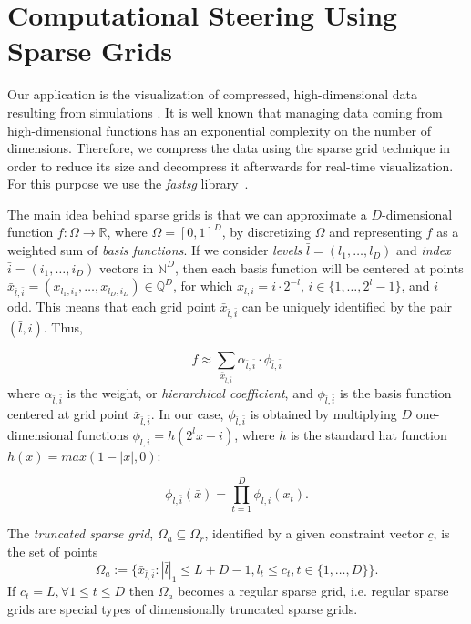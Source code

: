 \section{Computational Steering Using Sparse Grids}
\label{sec:comp_steering}

Our application is the visualization of compressed, high-dimensional data
resulting from simulations \cite{Butnaru201156}. It is well known that managing
data coming from high-dimensional functions has an exponential complexity on the
number of dimensions. Therefore, we compress the data using the sparse grid
technique in order to reduce its size and decompress it afterwards for real-time
visualization. For this purpose we use the \textit{fastsg}
library~\cite{murarasu12fastsg:}.

The main idea behind sparse grids is that we can approximate a $D$-dimensional
function $f : \Omega \rightarrow \mathbb{R}$, where $\Omega = [0, 1]^{D}$, by
discretizing $\Omega$ and representing $f$ as a weighted sum of \textit{basis
functions}. If we consider \textit{levels} $\bar{l} = (l_{1},\ldots,l_{D})$ and
\textit{index} $\bar{i} = (i_{1},\ldots,i_{D})$ vectors in $\mathbb{N}^{D}$,
then each basis function will be centered at points $\bar{x}_{\bar{l},\bar{i}} =
(x_{l_{1},i_{1}},\ldots,x_{l_{D},i_{D}}) \in \mathbb{Q}^{D}$, for which $x_{l,i}
= i \cdot 2^{-l}$, $i \in \{1,\ldots,2^{l} - 1\}$, and $i$ odd. This means that
each grid point $\bar{x}_{\bar{l},\bar{i}}$ can be uniquely identified by the
pair $(\bar{l},\bar{i})$. Thus,

\[ f \approx \sum_{\bar{x}_{\bar{l},\bar{i}}} \alpha_{\bar{l},\bar{i}} \cdot
\phi_{\bar{l},\bar{i}} \]
where $\alpha_{\bar{l},\bar{i}}$ is the weight, or \textit{hierarchical
coefficient}, and $\phi_{\bar{l},\bar{i}}$ is the basis function centered at
grid point $\bar{x}_{\bar{l},\bar{i}}$. In our case, $\phi_{\bar{l},\bar{i}}$ is
obtained by multiplying $D$ one-dimensional functions $\phi_{l,i} = h(2^{l}x -
i)$, where $h$ is the standard hat function $h(x) = max(1 - |x|, 0)$:

\[ \phi_{\bar{l},\bar{i}}(\bar{x}) = \prod_{t=1}^{D} \phi_{l,i}(x_{t}) .\]

The \textit{truncated sparse grid}, $\Omega_a \subseteq \Omega_r$, identified by
a given constraint vector $\underline{c}$, is the set of points
\begin{equation*}
\Omega_a := \{\bar{x}_{\bar{l}, \bar{i}} : |\bar{l}|_1 \leq L
+ D - 1, l_t \leq c_t,  t \in \{1, \dots, D\}\}.
\end{equation*}
If $c_t = L, \forall 1 \leq t \leq D$ then $\Omega_a$ becomes a regular sparse grid, i.e. regular sparse grids are special types of dimensionally truncated sparse grids.


